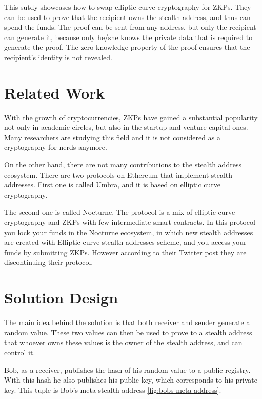 \documentclass[conference,comsoc,10pt]{IEEEtran}
\begin{document}
        This sutdy showcases how to swap elliptic curve cryptography for ZKPs.
        They can be used to prove that the recipient owns the stealth address, and
        thus can spend the funds. The proof can be sent from any address, but only
        the recipient can generate it, because only he/she knows the private data
        that is required to generate the proof. The zero knowledge property of the
        proof ensures that the recipient's identity is not revealed.

    \section{Related Work}

        With the growth of cryptocurrencies, ZKPs have gained a substantial popularity
        not only in academic circles, but also in the startup and venture capital
        ones. Many researchers are studying this field and it is not considered 
        as a cryptography for nerds anymore.

        On the other hand, there are not many contributions to the stealth address
        ecosystem. There are two protocols on Ethereum that implement stealth addresses.
        First one is called Umbra\cite{umbra}, and it is based on elliptic curve
        cryptography.

        The second one is called Nocturne\cite{nocturne}. The protocol is a mix of
        elliptic curve cryptography and ZKPs with few intermediate smart contracts.
        In this protocol you lock your funds in the Nocturne ecosystem, in which
        new stealth addresses are created with Elliptic curve stealth addresses scheme,
        and you access your funds by submitting ZKPs. However according to their
        \href{https://twitter.com/nocturne_xyz/status/1749510390906511693}{Twitter post}
        they are discontinuing their protocol.


\section{Solution Design}

    The main idea behind the solution is that both
    receiver and sender generate a random value. These two values can then
    be used to prove to a stealth address that whoever owns these values
    is the owner of the stealth address, and can control it.

    Bob, as a receiver, publishes the hash of his random value to a public
    registry. With this hash he also publishes his public key, which corresponds
    to his private key. This tuple is Bob's meta stealth address \ref{fig:bobs-meta-address}.
\end{document}
